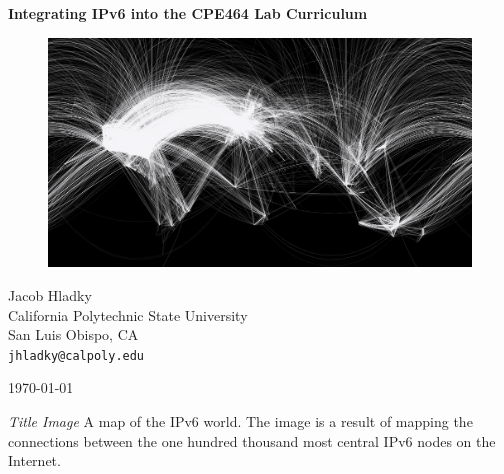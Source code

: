 \documentclass[12pt]{article}
\begin{document}
\begin{titlepage}
  \begin{center}
    \vspace*{1cm}
    \huge\textbf{{Integrating IPv6 into the CPE464 Lab Curriculum}}

    \vspace{1.5cm}

    \begin{figure}[ht!]
      \includegraphics[width=1\textwidth]{internet_map.png}
      \label{fig:internet_map}
    \end{figure}

    \vfill
    \large{
      Jacob Hladky\\
      California Polytechnic State University\\
      San Luis Obispo, CA\\
      \texttt{jhladky@calpoly.edu}
    }

    \vspace{1cm}

    \today   
  \end{center}
\end{titlepage}


\tableofcontents

\listoffigures
\bigskip
\textit{Title Image} \hspace{0.25in} A map of the IPv6 world. The image is a result of mapping the connections between the one hundred thousand most central IPv6 nodes on the Internet.

\begingroup
\let\clearpage\relax
\listoftables
\endgroup
\clearpage

\end{document}
